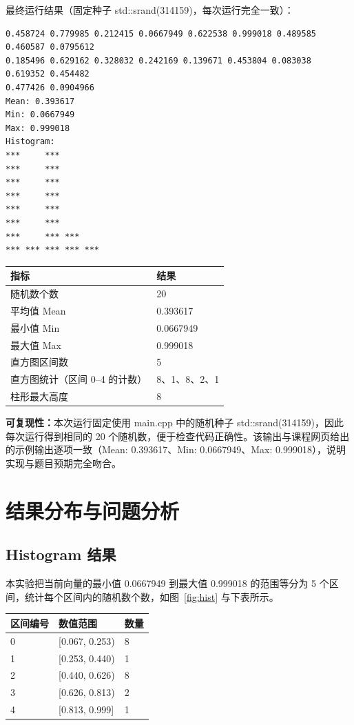 \documentclass[12pt,a4paper]{ctexart}
\begin{document}
最终运行结果（固定种子 std::srand(314159)，每次运行完全一致）：
\begin{lstlisting}
0.458724 0.779985 0.212415 0.0667949 0.622538 0.999018 0.489585 0.460587 0.0795612
0.185496 0.629162 0.328032 0.242169 0.139671 0.453804 0.083038 0.619352 0.454482
0.477426 0.0904966
Mean: 0.393617
Min: 0.0667949
Max: 0.999018
Histogram:
***     ***
***     ***
***     ***
***     ***
***     ***
***     ***
***     *** ***
*** *** *** *** ***
\end{lstlisting}

\begin{center}
\begin{tabular}{ll}
\toprule
指标 & 结果 \\
\midrule
随机数个数 & 20 \\
平均值 Mean & 0.393617 \\
最小值 Min & 0.0667949 \\
最大值 Max & 0.999018 \\
直方图区间数 & 5 \\
直方图统计（区间 0--4 的计数） & 8、1、8、2、1 \\
柱形最大高度 & 8 \\
\bottomrule
\end{tabular}
\end{center}

\textbf{可复现性：}本次运行固定使用 main.cpp 中的随机种子 std::srand(314159)，因此每次运行得到相同的 20 个随机数，便于检查代码正确性。该输出与课程网页给出的示例输出逐项一致（Mean: 0.393617、Min: 0.0667949、Max: 0.999018），说明实现与题目预期完全吻合。

\newpage

\section{结果分布与问题分析}

\subsection{Histogram 结果}

本实验把当前向量的最小值 0.0667949 到最大值 0.999018 的范围等分为 5 个区间，统计每个区间内的随机数个数，如图~\ref{fig:hist} 与下表所示。

\begin{center}
\begin{tabular}{lll}
\toprule
区间编号 & 数值范围 & 数量 \\
\midrule
0 & [0.067, 0.253) & 8 \\
1 & [0.253, 0.440) & 1 \\
2 & [0.440, 0.626) & 8 \\
3 & [0.626, 0.813) & 2 \\
4 & [0.813, 0.999] & 1 \\
\bottomrule
\end{tabular}
\end{center}
\end{document}
